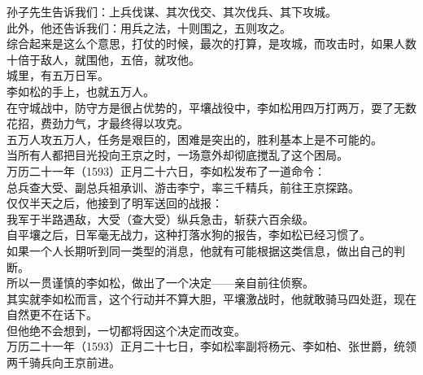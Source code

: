 \begin{multicols}{\theparacolNo}
孙子先生告诉我们：上兵伐谋、其次伐交、其次伐兵、其下攻城。\\

此外，他还告诉我们：用兵之法，十则围之，五则攻之。\\

综合起来是这么个意思，打仗的时候，最次的打算，是攻城，而攻击时，如果人数十倍于敌人，就围他，五倍，就攻他。\\

城里，有五万日军。\\

李如松的手上，也就五万人。\\

在守城战中，防守方是很占优势的，平壤战役中，李如松用四万打两万，耍了无数花招，费劲力气，才最终得以攻克。\\

五万人攻五万人，任务是艰巨的，困难是突出的，胜利基本上是不可能的。\\

当所有人都把目光投向王京之时，一场意外却彻底搅乱了这个困局。\\

万历二十一年（1593）正月二十六日，李如松发布了一道命令：\\

总兵查大受、副总兵祖承训、游击李宁，率三千精兵，前往王京探路。\\

仅仅半天之后，他接到了明军送回的战报：\\

我军于半路遇敌，大受（查大受）纵兵急击，斩获六百余级。\\

自平壤之后，日军毫无战力，这种打落水狗的报告，李如松已经习惯了。\\

如果一个人长期听到同一类型的消息，他就有可能根据这类信息，做出自己的判断。\\

所以一贯谨慎的李如松，做出了一个决定——亲自前往侦察。\\

其实就李如松而言，这个行动并不算大胆，平壤激战时，他就敢骑马四处逛，现在自然更不在话下。\\

但他绝不会想到，一切都将因这个决定而改变。\\

万历二十一年（1593）正月二十七日，李如松率副将杨元、李如柏、张世爵，统领两千骑兵向王京前进。\\


\end{multicols}
